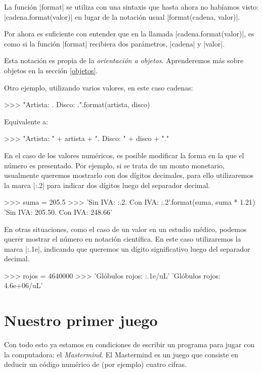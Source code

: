 \begin{sabias_que}
La función |format| se utiliza con una sintaxis que hasta ahora no habíamos
visto: |cadena.format(valor)| en lugar de la notación usual
|format(cadena, valor)|.

Por ahora es suficiente con entender que en la llamada |cadena.format(valor)|,
es como si la función |format| recibiera dos parámetros, |cadena| y |valor|.

Esta notación es propia de la {\it orientación a objetos}. Aprenderemos más
sobre objetos en la sección \ref{objetos}.
\end{sabias_que}

Otro ejemplo, utilizando varios valores, en este caso cadenas:
\begin{codigo-python-sn}
>>> "Artista: {}. Disco: {}.".format(artista, disco)
\end{codigo-python-sn}

Equivalente a:
\begin{codigo-python-sn}
>>> "Artista: " + artista + ". Disco: " + disco + "."
\end{codigo-python-sn}

En el caso de los valores numéricos, es posible modificar la forma en la que el
número es presentado. Por ejemplo, si se trata de un monto monetario, usualmente
queremos mostrarlo con dos dígitos decimales, para ello utilizaremos la
marca |{:.2}| para indicar dos dígitos luego del separador decimal.

\begin{codigo-python-sn}
>>> suma = 205.5
>>> 'Sin IVA: {:.2}. Con IVA: {:.2}'.format(suma, suma * 1.21)
'Sin IVA: 205.50. Con IVA: 248.66'
\end{codigo-python-sn}

En otras situaciones, como el caso de un valor en un estudio médico, podemos
querer mostrar el número en notación científica. En este caso utilizaremos la
marca |{:.1e}|, indicando que queremos un dígito significativo luego del separador
decimal.

\begin{codigo-python-sn}
>>> rojos = 4640000
>>> 'Glóbulos rojos: {:.1e}/uL'
'Glóbulos rojos: 4.6e+06/uL'
\end{codigo-python-sn}

\section{Nuestro primer juego}

Con todo esto ya estamos en condiciones de escribir un programa para jugar con
la computadora: el {\it Mastermind}. El Mastermind es un juego que consiste en
deducir un código numérico de (por ejemplo) cuatro cifras.

